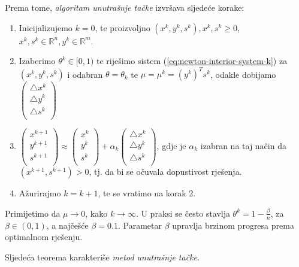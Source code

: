 \documentclass[a4paper, utf8, 11pt, colorlinks]{book}
\theoremstyle{definition}
\begin{document}
Prema tome, \emph{algoritam unutrašnje tačke} izvršava sljedeće korake:
\begin{enumerate}
	\item Inicijalizujemo $k=0$, te proizvoljno  $(x^k, y^k, s^k), x^k, s^k \geq 0$, $x^k,s^k \in \mathbb{R}^n, y^k \in \mathbb{R}^m$.
	\item Izaberimo $ \theta^k \in [0, 1)$ te riješimo sistem (\ref{eq:newton-interior-system-k}) za $(x^k,y^k,s^k)$ i odabran $\theta = \theta_k$ te $\mu = \mu^k = (y^k)^T s^k $,  odakle   dobijamo
	$  
	\begin{pmatrix}
		\bigtriangleup x^k      \\
		\bigtriangleup y^k       \\
		\bigtriangleup s^k       \\
	\end{pmatrix}    
	$
	
	\item $ 
	\begin{pmatrix}
		x^{k+1}  \\
		y^{k+1}   \\
		s^{k+1}   \\
	\end{pmatrix} \approx
	\begin{pmatrix}
		x^k  \\
		y^k  \\
		s^k  \\
	\end{pmatrix} +   
	\alpha_k 
	\begin{pmatrix}
		\bigtriangleup x^k       \\
		\bigtriangleup y^k       \\
		\bigtriangleup s^k       \\
	\end{pmatrix}  
	$, gdje je $\alpha_k$ izabran na taj način da $(x^{k+1}, s^{k+1}) > 0$, tj. da bi se očuvala dopustivost rješenja. 
	\item Ažurirajmo $k = k + 1$, te se vratimo na korak 2.
\end{enumerate}
Primijetimo da $\mu \rightarrow 0$, kako $k \rightarrow \infty$. U praksi se često stavlja $\theta^k = 1 - \frac{\beta}{n}$, za $\beta \in (0,1)$, a najčešće $\beta= 0.1$.  Parametar $\beta$ upravlja brzinom progresa prema optimalnom rješenju.  


Sljedeća teorema   karakteriše \emph{metod unutrašnje tačke}.
\end{document}
